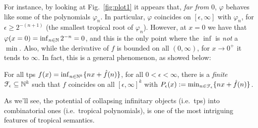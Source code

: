 For instance, by looking at Fig.~\ref{fig:plot1} it appears that, \emph{far from $0$}, $\varphi$ behaves like some of the polynomials $\varphi_{n}$.
In particular, %
$\varphi$ coincides on $[\epsilon,\infty]$ with $\varphi_{n}$,
for $\epsilon \geq 2^{-(n+1)}$ (the smallest tropical root of $\varphi_{n}$).
However, at
%
 $x=0$ we have that $\varphi(x=0)=\inf_{n\in\mathbb{N}} 2^{-n}=0$, and this is the only point where the $\inf$ is \emph{not} a $\min$.
Also, while the derivative of $f$ is bounded on all $(0,\infty)$, for $x\to 0^+$ it tends to $\infty$.
In fact, this is a general phenomenon, as showed below:
% 

\begin{theorem}\label{theorem:fepsilon}
For all tps $f(x)=\inf_{n\in \mathbb N^{k}}\{n x+\hat{f}(n)\}$, for all $0<\epsilon<\infty$, there is a \emph{finite} $\mathcal{F}_\epsilon \subseteq \mathbb{N}^k$ such that 
% 
$f$ coincides on all $[\epsilon,\infty]^k$ with $P_\epsilon( x):=\min_{n\in \mathcal{F}_\epsilon}\{n x+\hat{f}(n)\}$.
\end{theorem}
As we'll see, the potential of collapsing infinitary objects (i.e.~tps) into combinatorial ones (i.e.~tropical polynomials), is one of the most intriguing features of tropical semantics. 


